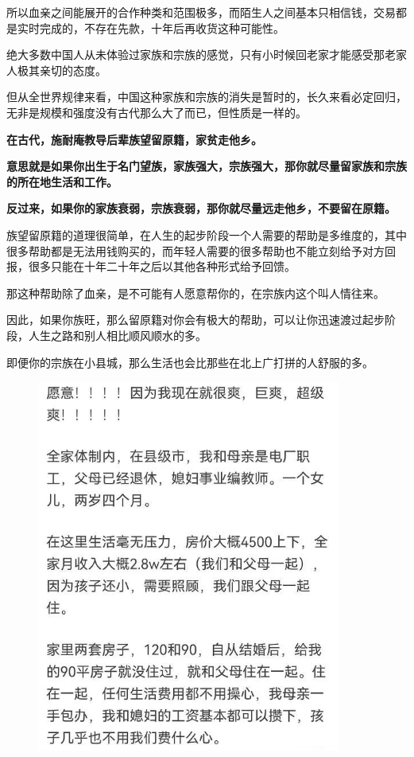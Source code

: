 \documentclass[UTF8, 11pt, oneside]{ctexart}
\newcommand{\zd}[1]{\textbf{\textcolor[RGB]{123,12,0}{#1}}} %
\begin{document}
所以血亲之间能展开的合作种类和范围极多，而陌生人之间基本只相信钱，交易都是实时完成的，不存在先款，十年后再收货这种可能性。

绝大多数中国人从未体验过家族和宗族的感觉，只有小时候回老家才能感受那老家人极其亲切的态度。

但从全世界规律来看，中国这种家族和宗族的消失是暂时的，长久来看必定回归，无非是规模和强度没有古代那么大了而已，但性质是一样的。

\zd{在古代，施耐庵教导后辈族望留原籍，家贫走他乡。}

\zd{意思就是如果你出生于名门望族，家族强大，宗族强大，那你就尽量留家族和宗族的所在地生活和工作。}

\zd{反过来，如果你的家族衰弱，宗族衰弱，那你就尽量远走他乡，不要留在原籍。}

族望留原籍的道理很简单，在人生的起步阶段一个人需要的帮助是多维度的，其中很多帮助都是无法用钱购买的，而年轻人需要的很多帮助也不能立刻给予对方回报，很多只能在十年二十年之后以其他各种形式给予回馈。

那这种帮助除了血亲，是不可能有人愿意帮你的，在宗族内这个叫人情往来。

因此，如果你族旺，那么留原籍对你会有极大的帮助，可以让你迅速渡过起步阶段，人生之路和别人相比顺风顺水的多。

即便你的宗族在小县城，那么生活也会比那些在北上广打拼的人舒服的多。

\begin{figure}[htbp]
    \centering
    \includegraphics[width=10cm]{2023-01-07-001.jpg}
\end{figure}
\end{document}
